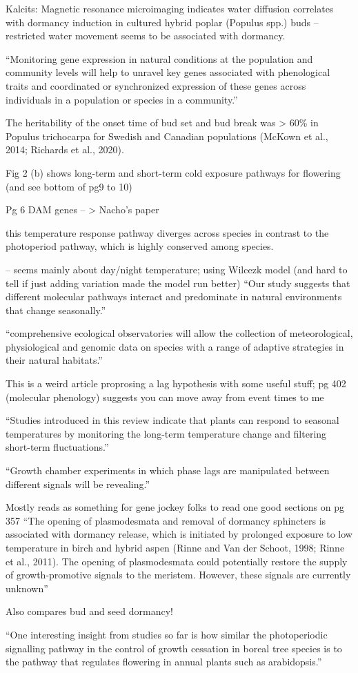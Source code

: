 \documentclass[11pt,letter]{article}
\begin{document}
 


Kalcits: Magnetic resonance microimaging indicates water diffusion correlates with dormancy induction in cultured hybrid poplar
(Populus spp.) buds -- restricted water movement seems to be associated with dormancy.


\cite{Satake2022} ``Monitoring gene expression in natural conditions at the population
and community levels will help to unravel key genes associated with
phenological traits and coordinated or synchronized expression of
these genes across individuals in a population or species in a
community.''

The heritability of
the onset time of bud set and bud break was > 60\% in Populus
trichocarpa for Swedish and Canadian populations (McKown et al.,
2014; Richards et al., 2020).

Fig 2 (b) shows long-term and short-term cold exposure pathways for flowering (and see bottom of pg9 to 10)

Pg 6 DAM genes -- > Nacho's paper


this temperature response pathway diverges across species in
contrast to the photoperiod pathway, which is highly conserved
among species.

\cite{Chew:2012pd} -- seems mainly about day/night temperature; using Wilcezk model (and hard to tell if just adding variation made the model run better) ``Our study suggests that different molecular pathways interact and predominate in natural
environments that change seasonally.''

``comprehensive ecological observatories will allow the collection
of meteorological, physiological and genomic data on species
with a range of adaptive strategies in their natural habitats.''


\cite{kudoh2016} This is a weird article proprosing a lag hypothesis with some useful stuff; pg 402 (molecular phenology) suggests you can move away from event times to me

``Studies introduced in this review indicate that plants can respond to
seasonal temperatures by monitoring the long-term temperature
change and filtering short-term fluctuations.''

``Growth chamber experiments in which phase lags are manipulated
between different signals will be revealing.''

\cite{Maurya2017} Mostly reads as something for gene jockey folks to read one good sections on pg 357 
``The opening of plasmodesmata and removal
of dormancy sphincters is associated with dormancy release,
which is initiated by prolonged exposure to low temperature in
birch and hybrid aspen (Rinne and Van der Schoot, 1998; Rinne
et al., 2011). The opening of plasmodesmata could potentially
restore the supply of growth-promotive signals to the meristem.
However, these signals are currently unknown''

Also compares bud and seed dormancy!

``One interesting insight from studies so far is
how similar the photoperiodic signalling pathway in the control
of growth cessation in boreal tree species is to the pathway that
regulates flowering in annual plants such as arabidopsis.''
\end{document}
